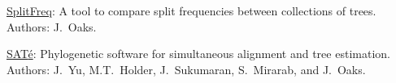 \myHangIndent
\href{https://github.com/joaks1/abacus}{SplitFreq}:
    A tool to compare split frequencies between collections of trees.
    Authors: J.\ Oaks.

\myHangIndent
\href{http://phylo.bio.ku.edu/software/sate/sate.html}{{SAT}\'{e}}:
    Phylogenetic software for simultaneous alignment and tree estimation.
    Authors: J.\ Yu, M.T.\ Holder, J.\ Sukumaran, S.\ Mirarab, and J.\ Oaks.
